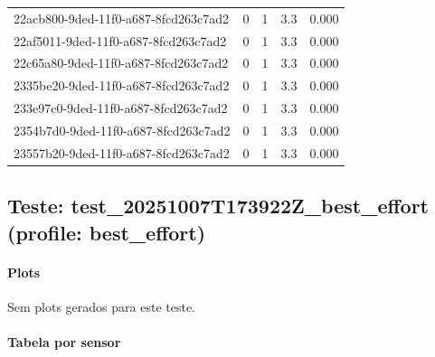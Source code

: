 \begin{longtable}{l r r r r}
22acb800-9ded-11f0-a687-8fcd263c7ad2 & 0 & 1 & 3.3 & 0.000 \\

22af5011-9ded-11f0-a687-8fcd263c7ad2 & 0 & 1 & 3.3 & 0.000 \\

22c65a80-9ded-11f0-a687-8fcd263c7ad2 & 0 & 1 & 3.3 & 0.000 \\

2335be20-9ded-11f0-a687-8fcd263c7ad2 & 0 & 1 & 3.3 & 0.000 \\

233e97c0-9ded-11f0-a687-8fcd263c7ad2 & 0 & 1 & 3.3 & 0.000 \\

2354b7d0-9ded-11f0-a687-8fcd263c7ad2 & 0 & 1 & 3.3 & 0.000 \\

23557b20-9ded-11f0-a687-8fcd263c7ad2 & 0 & 1 & 3.3 & 0.000 \\

\end{longtable}



\subsection{Teste: test_20251007T173922Z_best_effort (profile: best_effort)}
\paragraph{Plots}

Sem plots gerados para este teste.


\paragraph{Tabela por sensor}

